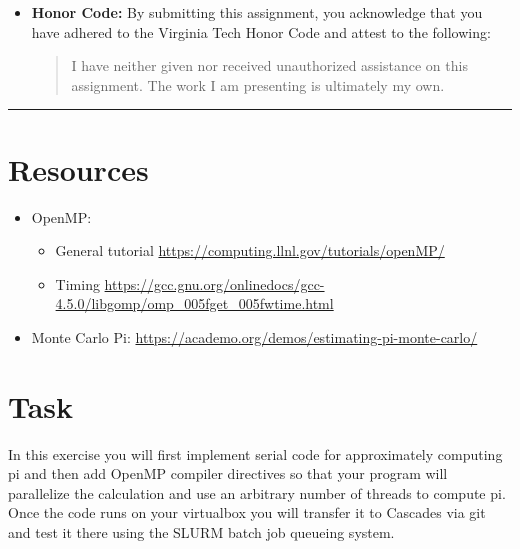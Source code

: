 \documentclass[letter]{article}
\begin{document}
\begin{itemize}[leftmargin=*]
    \item[] \textbf{Honor Code: } By submitting this assignment, you acknowledge that you have adhered to the Virginia Tech Honor Code and attest to the following:
        \begin{quote}
           I have neither given nor received unauthorized assistance on this assignment.  The work I am presenting is ultimately my own.
        \end{quote}
\end{itemize}

\hrule

\pagebreak

\section*{Resources}

\begin{itemize}

    \item OpenMP:
        \begin{itemize}
            \item General tutorial  \url{https://computing.llnl.gov/tutorials/openMP/}
            \item Timing  \url{https://gcc.gnu.org/onlinedocs/gcc-4.5.0/libgomp/omp_005fget_005fwtime.html}
        \end{itemize}
    \item Monte Carlo Pi: \url{https://academo.org/demos/estimating-pi-monte-carlo/}

\end{itemize}

\section*{Task}
In this exercise you will first implement serial code for approximately computing pi and then add OpenMP compiler directives so that your program will parallelize the calculation and use an arbitrary number of threads to compute pi. Once the code runs on your virtualbox you will transfer it to Cascades via git and test it there using the SLURM batch job queueing system.
\end{document}
